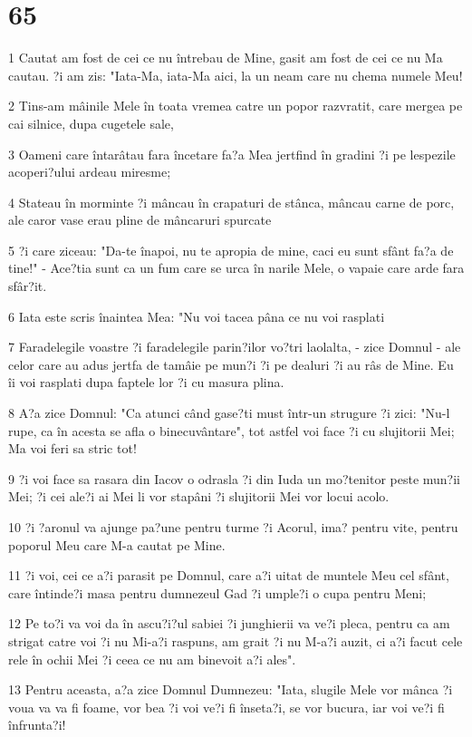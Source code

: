 \chapter{65}

\par 1 Cautat am fost de cei ce nu întrebau de Mine, gasit am fost de cei ce nu Ma cautau. ?i am zis: "Iata-Ma, iata-Ma aici, la un neam care nu chema numele Meu!
\par 2 Tins-am mâinile Mele în toata vremea catre un popor razvratit, care mergea pe cai silnice, dupa cugetele sale,
\par 3 Oameni care întarâtau fara încetare fa?a Mea jertfind în gradini ?i pe lespezile acoperi?ului ardeau miresme;
\par 4 Stateau în morminte ?i mâncau în crapaturi de stânca, mâncau carne de porc, ale caror vase erau pline de mâncaruri spurcate
\par 5 ?i care ziceau: "Da-te înapoi, nu te apropia de mine, caci eu sunt sfânt fa?a de tine!" - Ace?tia sunt ca un fum care se urca în narile Mele, o vapaie care arde fara sfâr?it.
\par 6 Iata este scris înaintea Mea: "Nu voi tacea pâna ce nu voi rasplati
\par 7 Faradelegile voastre ?i faradelegile parin?ilor vo?tri laolalta, - zice Domnul - ale celor care au adus jertfa de tamâie pe mun?i ?i pe dealuri ?i au râs de Mine. Eu îi voi rasplati dupa faptele lor ?i cu masura plina.
\par 8 A?a zice Domnul: "Ca atunci când gase?ti must într-un strugure ?i zici: "Nu-l rupe, ca în acesta se afla o binecuvântare", tot astfel voi face ?i cu slujitorii Mei; Ma voi feri sa stric tot!
\par 9 ?i voi face sa rasara din Iacov o odrasla ?i din Iuda un mo?tenitor peste mun?ii Mei; ?i cei ale?i ai Mei li vor stapâni ?i slujitorii Mei vor locui acolo.
\par 10 ?i ?aronul va ajunge pa?une pentru turme ?i Acorul, ima? pentru vite, pentru poporul Meu care M-a cautat pe Mine.
\par 11 ?i voi, cei ce a?i parasit pe Domnul, care a?i uitat de muntele Meu cel sfânt, care întinde?i masa pentru dumnezeul Gad ?i umple?i o cupa pentru Meni;
\par 12 Pe to?i va voi da în ascu?i?ul sabiei ?i junghierii va ve?i pleca, pentru ca am strigat catre voi ?i nu Mi-a?i raspuns, am grait ?i nu M-a?i auzit, ci a?i facut cele rele în ochii Mei ?i ceea ce nu am binevoit a?i ales".
\par 13 Pentru aceasta, a?a zice Domnul Dumnezeu: "Iata, slugile Mele vor mânca ?i voua va va fi foame, vor bea ?i voi ve?i fi înseta?i, se vor bucura, iar voi ve?i fi înfrunta?i!
